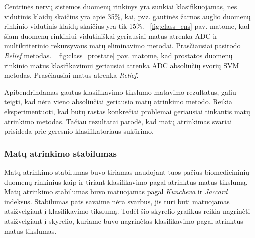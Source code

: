 Centrinės nervų sistemos duomenų rinkinys yra sunkiai klasifikuojamas, nes vidutinis klaidų skaičius yra apie 35\%, kai, pvz. gautinės žarnos auglio duomenų rinkinio vidutinis klaidų skaičius yra tik 15\%. ~\ref{fig:class_cns} pav. matome, kad šiam duomenų rinkiniui vidutiniškai geriausiai matus atrenka ADC ir multikriterinio rekursyvaus matų eliminavimo metodai. Prasčiausiai pasirodo \textit{Relief} metodas.
~\ref{fig:class_prostate} pav. matome, kad prostatos duomenų rinkinio matus klasifikavimui geriausiai atrenka ADC absoliučių svorių SVM metodas. Prasčiausiai matus atrenka \textit{Relief}.

Apibendrindamas gautus klasifikavimo tikslumo matavimo rezultatus, galiu teigti, kad nėra vieno absoliučiai geriausio matų atrinkimo metodo. Reikia eksperimentuoti, kad būtų rastas konkrečiai problemai geriausiai tinkantis matų atrinkimo metodas. Tačiau rezultatai parodė, kad matų atrinkimas svariai prisideda prie geresnio klasifikatoriaus sukūrimo.

\subsubsection{Matų atrinkimo stabilumas}

Matų atrinkimo stabilumas buvo tiriamas naudojant tuos pačius biomedicininių duomenų rinkinius kaip ir tiriant klasifikavimo pagal atrinktus matus tikslumą. Matų atrinkimo stabilumas buvo matuojamas pagal \textit{Kuncheva} ir \textit{Jaccard} indeksus. Stabilumas pats savaime nėra svarbus, jis turi būti matuojamas atsižvelgiant į klasifikavimo tikslumą. Todėl šio skyrelio grafikus reikia nagrinėti atsižvelgiant į skyrelio, kuriame buvo nagrinėtas klasifikavimo pagal atrinktus matus tikslumas.

